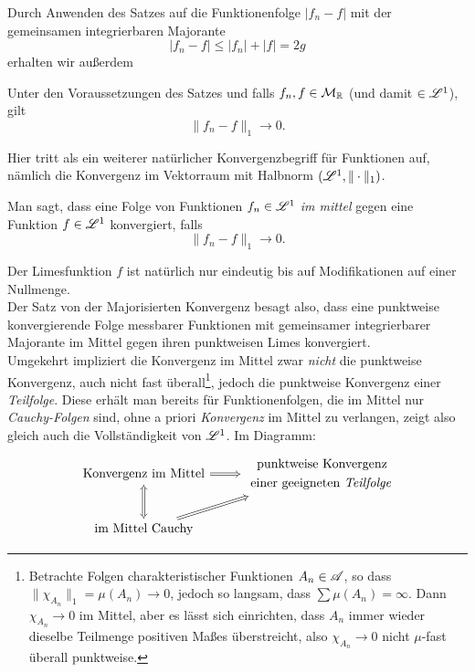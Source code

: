 Durch Anwenden des Satzes auf die Funktionenfolge $|f_n-f|$ mit der gemeinsamen integrierbaren Majorante $$|f_n-f|\leq |f_n| + |f| = 2g$$ erhalten wir außerdem
\begin{korollar}
\begin{mdframed}
Unter den Voraussetzungen des Satzes und falls $f_n,f\in \MM_\R$ (und damit $\in \LL^1$), gilt
$$\|f_n-f\|_1\longrightarrow 0.$$
\end{mdframed}
\end{korollar}
Hier tritt als ein weiterer natürlicher Konvergenzbegriff für Funktionen auf, nämlich die Konvergenz im Vektorraum mit Halbnorm $(\LL^1,\|\cdot\|_1)$.

\begin{definition}
\begin{mdframed}
Man sagt, dass eine Folge von Funktionen $f_n \in \LL^1$ \emph{im mittel} gegen eine Funktion $f\in \LL^1$ konvergiert, falls $$\|f_n-f\|_1\longrightarrow 0.$$
\end{mdframed}
\end{definition}
Der Limesfunktion $f$ ist natürlich nur eindeutig bis auf Modifikationen auf einer Nullmenge. \vspace{0.3pc}\\
Der Satz von der Majorisierten Konvergenz besagt also, dass eine punktweise konvergierende Folge messbarer Funktionen mit gemeinsamer integrierbarer Majorante im Mittel gegen ihren punktweisen Limes konvergiert.\vspace{0.3pc}\\
Umgekehrt impliziert die Konvergenz im Mittel zwar \emph{nicht} die punktweise Konvergenz, auch nicht fast überall\footnote{Betrachte Folgen charakteristischer Funktionen $A_n \in \AA$, so dass $\|\chi_{A_n}\|_1=\mu(A_n)\to 0$, jedoch so langsam, dass $\sum\mu(A_n)=\infty$. Dann $\chi_{A_n}\to 0$ im Mittel, aber es lässt sich einrichten, dass $A_n$ immer wieder dieselbe Teilmenge positiven Maßes überstreicht, also $\chi_{A_n}\to 0$ nicht $\mu$-fast überall punktweise.}, jedoch die punktweise Konvergenz einer \emph{Teilfolge}. Diese erhält man bereits für Funktionenfolgen, die im Mittel nur \emph{Cauchy-Folgen} sind, ohne a priori \emph{Konvergenz} im Mittel zu verlangen, zeigt also gleich auch die Vollständigkeit von $\LL^1$. Im Diagramm:
$$\begin{tikzcd}
	\te{Konvergenz im Mittel} \arrow[Rightarrow]{r} & \begin{split}\te{punktweise Konvergenz }\\\ \te{einer geeigneten \emph{Teilfolge}}\end{split}\\
	\te{im Mittel Cauchy} \arrow[Rightarrow]{ur} \arrow[Leftrightarrow]{u}%
\end{tikzcd}$$
